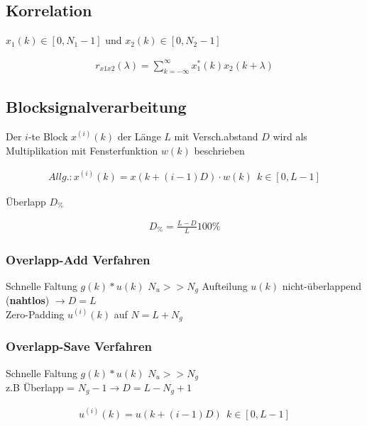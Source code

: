 \documentclass[10pt,a4paper]{article}
\begin{document}
  \subsection{Korrelation}
  $x_1(k) \in [0,N_1-1]$ und $x_2(k) \in [0,N_2-1]$
  \begin{mdframed}[style=exercise]
    \begin{align}
        r_{x1x2}(\lambda) = \sum_{k=-\infty}^{\infty}x_1^*(k) x_2(k+\lambda) 
    \end{align}
  \end{mdframed}
  \subsection{Blocksignalverarbeitung}
  Der $i$-te Block $x^{(i)}(k)$ der Länge $L$ mit Versch.abstand $D$ 
  wird als Multiplikation mit Fensterfunktion $w(k)$ beschrieben
  \begin{mdframed}[style=exercise]
    \begin{align}
        Allg.:
        x^{(i)}(k) = x(k+(i-1)D) \cdot w(k)\ \ k\in[0,L-1] 
    \end{align}
  \end{mdframed}
  Überlapp $D_\%$
  \begin{mdframed}[style=exercise]
    \begin{align}
        D_\% = \frac{L-D}{L}100\%
    \end{align}
  \end{mdframed}
  \subsubsection{Overlapp-Add Verfahren}
  Schnelle Faltung $g(k)*u(k)$ $N_u >> N_g$ 
  Aufteilung $u(k)$ nicht-überlappend (\textbf{nahtlos}) $\rightarrow D=L$ \\
  Zero-Padding $u^{(i)}(k)$ auf $N=L+N_g$ 
  \subsubsection{Overlapp-Save Verfahren}
  Schnelle Faltung $g(k)*u(k)$ $N_u >> N_g$ \\
  z.B Überlapp = $N_g-1 \rightarrow D=L-N_g+1$ \\
  \begin{mdframed}[style=exercise]
    \begin{align}
        u^{(i)}(k) = u(k+(i-1)D) \ \ k\in[0,L-1]
    \end{align}
  \end{mdframed}
\end{document}
